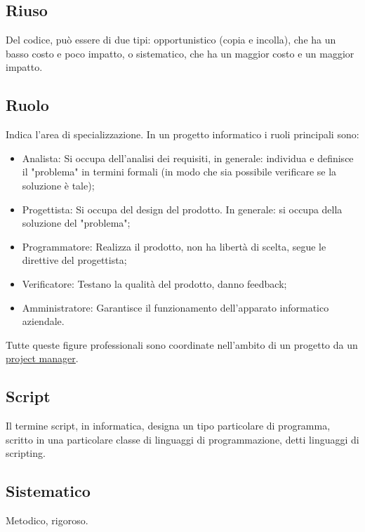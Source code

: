 	\subsection{Riuso}
	\label{sec:riuso}
	Del codice, può essere di due tipi: opportunistico (copia e incolla), che ha un basso costo e poco impatto, o sistematico, che ha un maggior costo e un maggior impatto.		

	\subsection{Ruolo}
	\label{sec:ruolo}
	Indica l'area di specializzazione.
	In un progetto informatico i ruoli principali sono:
	\begin{itemize}  
	\item Analista: Si occupa dell'analisi dei requisiti, in generale: individua e definisce il "problema" in termini formali (in modo che sia possibile verificare se la soluzione è tale);
	\item Progettista: Si occupa del design del prodotto. In generale: si occupa della soluzione del "problema";
	\item Programmatore: Realizza il prodotto, non ha libertà di scelta, segue le direttive del progettista;
	\item Verificatore: Testano la qualità del prodotto, danno feedback;
	\item Amministratore: Garantisce il funzionamento dell'apparato informatico aziendale. 
	\end{itemize}
	Tutte queste figure professionali sono coordinate nell'ambito di un progetto da un \underline{\hyperref[sec:projectmanager]{project manager}}.
	\newpage	

	
	\subsection{Script}
	\label{sec:script}
	Il termine script, in informatica, designa un tipo particolare di programma, scritto in una particolare classe di linguaggi di programmazione, detti linguaggi di scripting.
	
	\subsection{Sistematico}
	\label{sec:sistematico}
	Metodico, rigoroso.

